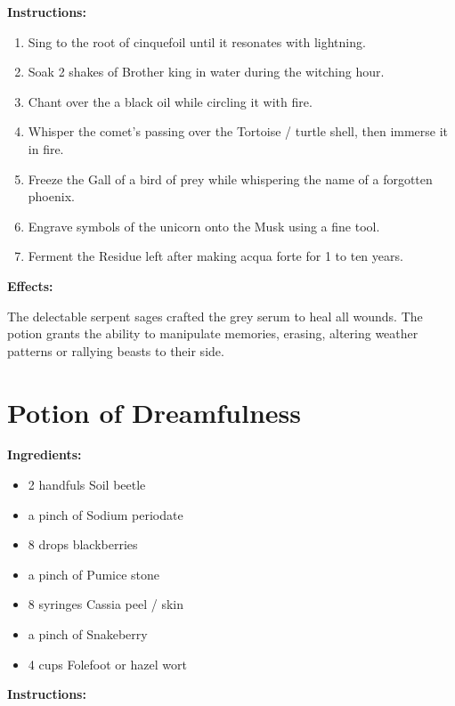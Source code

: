 \documentclass{article}
\begin{document}
\textbf{Instructions:}

\begin{enumerate}
  \item Sing to the root of cinquefoil until it resonates with lightning.
  \item Soak 2 shakes of Brother king in water during the witching hour.
  \item Chant over the a black oil while circling it with fire.
  \item Whisper the comet’s passing over the Tortoise / turtle   shell, then immerse it in fire.
  \item Freeze the Gall of a bird of prey while whispering the name of a forgotten phoenix.
  \item Engrave symbols of the unicorn onto the Musk using a fine tool.
  \item Ferment the Residue left after making acqua forte for 1 to ten years.
\end{enumerate}

\textbf{Effects:}

The delectable serpent sages crafted the grey serum to heal all wounds. The potion grants the ability to manipulate memories, erasing, altering weather patterns or rallying beasts to their side.

\newpage
\section*{Potion of Dreamfulness}

\textbf{Ingredients:}

\begin{itemize}
  \item 2 handfuls Soil beetle
  \item a pinch of Sodium periodate
  \item 8 drops blackberries
  \item a pinch of Pumice stone
  \item 8 syringes Cassia peel / skin
  \item a pinch of Snakeberry
  \item 4 cups Folefoot or hazel wort
\end{itemize}

\textbf{Instructions:}
\end{document}
